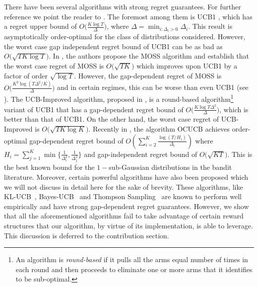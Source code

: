 	There have been several algorithms with strong regret guarantees. For further reference we point the reader to \citet{bubeck2012bandits}. The foremost among them is UCB1 \citep{auer2002finite}, which has a regret upper bound of $O\big(\frac{K\log T}{\Delta}\big)$, where $\Delta = \min_{i:\Delta_i>0} \Delta_i$. This result is asymptotically order-optimal for the class of distributions considered. However, the worst case gap independent regret bound of UCB1  can be as bad as $O \big(\sqrt{TK\log T}\big)$.  In \citet{audibert2009minimax}, the authors propose the MOSS algorithm and establish that the worst case regret of MOSS is $O\big(\sqrt{TK}\big)$ which improves upon UCB1 by a factor of order $\sqrt{\log T}$. However, the gap-dependent regret of MOSS is  $O\big(\frac{K^{2}\log\left(T\Delta^{2}/K\right)}{\Delta}\big)$ and in certain regimes, this can be worse than even UCB1 (see \citep{audibert2009minimax,lattimore2015optimally}). The UCB-Improved algorithm, proposed in \citet{auer2010ucb}, is a round-based algorithm\footnote{An algorithm is \textit{round-based} if it pulls all the arms equal number of times in each round and then proceeds to eliminate one or more arms that it identifies to be sub-optimal.} variant of UCB1 that 
has a gap-dependent regret bound of $O\big(\frac{K\log T\Delta^{2}}{\Delta}\big)$, which is better than that of UCB1. On the other hand, the worst case regret of UCB-Improved is $O\big(\sqrt{TK\log K}\big)$. Recently in \citet{lattimore2015optimally}, the algorithm OCUCB achieves order-optimal gap-dependent regret bound of $O\left(\sum_{i=2}^{K}\frac{\log\left(T/H_i\right)}{\Delta_i}\right)$ where $H_i=\sum_{j=1}^{K}\min\lbrace \frac{1}{\Delta_i^2},\frac{1}{\Delta_j^2}\rbrace$ and gap-independent regret bound of $O\big( \sqrt{KT}\big)$. This is the best known bound for the $1-$sub-Gaussian distributions in the bandit literature. Moreover, certain powerful algorithms have also been proposed which we will not discuss in detail here for the sake of brevity. These algorithms, like KL-UCB~\citep{garivier2011kl}, Bayes-UCB~\citep{kaufmann2012bayesian} and Thompson Sampling~\citep{thompson1933likelihood,agrawal2011analysis} are known to perform well empirically and have strong gap-dependent regret guarantees.  However, we show that all the aforementioned algorithms fail to take advantage of certain reward structures that our algorithm, by virtue of its implementation, is able to leverage. This discussion is deferred to the contribution section.

